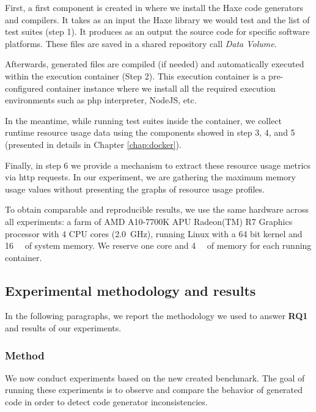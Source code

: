 First, a first component is created in where we install the Haxe code generators and compilers. It takes as an input the Haxe library we would test and the list of test suites (step 1). It produces as an output the source code for specific software platforms. These files are saved in a shared repository call \textit{Data Volume}.

Afterwards, generated files are compiled (if needed) and automatically executed within the execution container (Step 2). This execution container is a pre-configured container instance where we install all the required execution environments such as php interpreter, NodeJS, etc. 

In the meantime, while running test suites inside the container, we collect runtime resource usage data using the components showed in step 3, 4, and 5 (presented in details in Chapter \ref{chap:docker}).

Finally, in step 6 we provide a mechanism to extract these resource usage metrics via http requests. In our experiment, we are gathering the maximum memory usage values without presenting the graphs of resource usage profiles.

To obtain comparable and reproducible results, we use the same hardware across all experiments: a farm of AMD A10-7700K APU Radeon(TM) R7 Graphics processor with 4 CPU cores (\SI{2.0}{\GHz}), running Linux with a 64 bit kernel and \SI{16}{\giga\byte} of system memory. We reserve one core and \SI{4}{\giga\byte} of memory for each running container. 

\subsection{Experimental methodology and results}
In the following paragraphs, we report the methodology we used to answer \textbf{RQ1} and results of our experiments. 

\subsubsection{Method}
We now conduct experiments based on the new created benchmark. 
The goal of running these experiments is to observe and compare the behavior of generated code in order to detect code generator inconsistencies.

